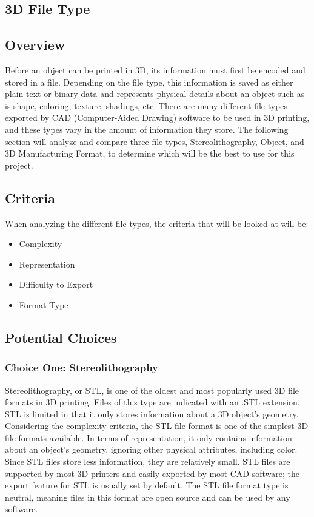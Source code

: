 \documentclass[letterpaper, onecolumn, draftclsnofoot,10pt, compsoc]{IEEEtran}
\begin{document}
\begin{singlespace}
\section{3D File Type}
\subsection{Overview}
Before an object can be printed in 3D, its information must first be encoded and stored in a file. 
Depending on the file type, this information is saved as either plain text or binary data and represents physical details about an object such as is shape, coloring, texture, shadings, etc. \cite{all3dpweb}
There are many different file types exported by CAD (Computer-Aided Drawing) software to be used in 3D printing, and these types vary in the amount of information they store.
The following section will analyze and compare three file types, Stereolithography, Object, and 3D Manufacturing Format, to determine which will be the best to use for this project.
 
\subsection{Criteria}
When analyzing the different file types, the criteria that will be looked at will be: 
\begin{itemize}
\item Complexity
\item Representation
\item Difficulty to Export
\item Format Type
\end{itemize}
\subsection{Potential Choices}
\subsubsection{Choice One: Stereolithography}
Stereolithography, or STL, is one of the oldest and most popularly used 3D file formats in 3D printing. 
Files of this type are indicated with an .STL extension.
STL is limited in that it only stores information about a 3D object's geometry.
Considering the complexity criteria, the STL file format is one of the simplest 3D file formats available.
In terms of representation, it only contains information about an object's geometry, ignoring other physical attributes, including color.
Since STL files store less information, they are relatively small.
STL files are supported by most 3D printers and easily exported by most CAD software; the export feature for STL is usually set by default. \cite{3dbeginweb}
The STL file format type is neutral, meaning files in this format are open source and can be used by any software.
\cite{all3dpweb}

\end{singlespace}
\end{document}
